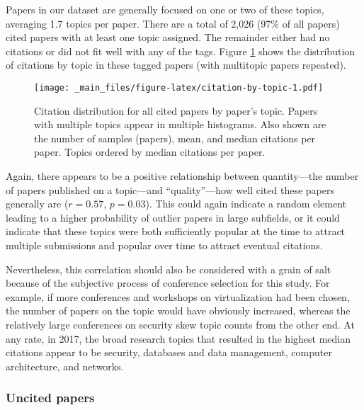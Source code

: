 \documentclass{article}
\begin{document}
Papers in our dataset are generally focused on one or two of these topics, averaging
1.7 topics per paper.
There are a total of 2,026 (97\% of all papers)
cited papers with at least one topic assigned.
The remainder either had no citations or did not fit well with any of the tags.
Figure \ref{fig:citation-by-topic} shows the distribution of citations by topic in these tagged papers (with multitopic papers repeated).

\begin{figure}
\centering
\texttt{[image: \_main\_files/figure-latex/citation-by-topic-1.pdf]}
\caption{\label{fig:citation-by-topic}Citation distribution for all cited papers by paper's topic. Papers with multiple topics appear in multiple histograms. Also shown are the number of samples (papers), mean, and median citations per paper. Topics ordered by median citations per paper.}
\end{figure}

Again, there appears to be a positive relationship between quantity---the number of papers published on a topic---and ``quality''---how well cited these papers generally are (\(r=0.57\), \(p=0.03\)).
This could again indicate a random element leading to a higher probability of outlier papers in large subfields, or it could indicate that these topics were both sufficiently popular at the time to attract multiple submissions and popular over time to attract eventual citations.

Nevertheless, this correlation should also be considered with a grain of salt because of the subjective process of conference selection for this study.
For example, if more conferences and workshops on virtualization had been chosen, the number of papers on the topic would have obviously increased, whereas the relatively large conferences on security skew topic counts from the other end.
At any rate, in 2017, the broad research topics that resulted in the highest median citations appear to be security, databases and data management, computer architecture, and networks.

\hypertarget{uncited-papers}{%
\subsubsection{Uncited papers}\label{uncited-papers}}
\end{document}
